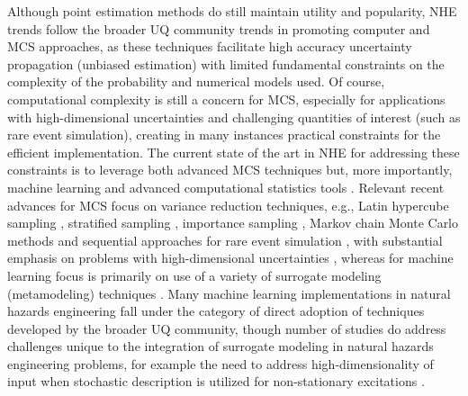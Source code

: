 Although point estimation methods do still maintain utility and popularity, NHE trends follow the broader UQ community trends in promoting computer and MCS approaches, as these techniques facilitate high accuracy uncertainty propagation (unbiased estimation) with limited fundamental constraints on the complexity of the probability and numerical models used. Of course, computational complexity is still a concern for MCS, especially for applications with high-dimensional uncertainties and challenging quantities of interest (such as rare event simulation), creating in many instances practical constraints for the efficient implementation. The current state of the art in NHE for addressing these constraints is to leverage both advanced MCS techniques \citep{au2003subset,li2017system,bansal2018subset} but, more importantly, machine learning and advanced computational statistics tools \citep{echard2011akmcs, abbiati2017hierarchical, ding2018multifidelity, su2018efficient, wang2018bayesian}. Relevant recent advances for MCS focus on variance reduction techniques, e.g., Latin hypercube sampling \citep{vamvatsikos2014seismic}, stratified sampling \citep{jayaram2010efficient}, importance sampling \citep{papaioannou2018reliability}, Markov chain Monte Carlo methods \citep{au2003subset} and sequential approaches for rare event simulation \citep{jia2017new}, with substantial emphasis on problems with high-dimensional uncertainties \citep{au2003subset,wang2016crossentropybased}, whereas for machine learning focus is primarily on use of a variety of surrogate modeling (metamodeling) techniques \citep{stern2017accelerated, zhang2018adaptive, bernier2019fragility, gentile2020gaussian, le2020neural, zhang2020physicsguided}. Many machine learning implementations in natural hazards engineering fall under the category of direct adoption of techniques developed by the broader UQ community, though number of studies do address challenges unique to the integration of surrogate modeling in natural hazards engineering problems, for example the need to address high-dimensionality of input when stochastic description is utilized for non-stationary excitations \citep{gidaris2015kriging}.  

